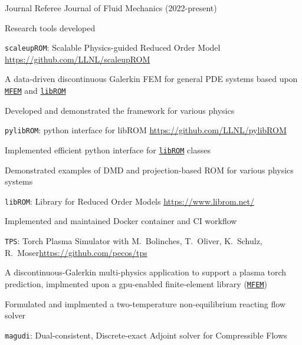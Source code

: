 \documentclass{resume} %
\begin{document}
\begin{rSection}{Journal Referee}
Journal of Fluid Mechanics (2022-present)
\end{rSection}


\begin{rSection}{Research tools developed}
\begin{rSubsection}{\texttt{scaleupROM}: Scalable Physics-guided Reduced Order Model}{}
{ }{\url{https://github.com/LLNL/scaleupROM}}
\item A data-driven discontinuous Galerkin FEM for general PDE systems
based upon \href{https://mfem.org}{\texttt{MFEM}} and \href{https://www.librom.net}{\texttt{libROM}}
\item Developed and demonstrated the framework for various physics
\end{rSubsection}
\begin{rSubsection}{\texttt{pylibROM}: python interface for libROM}{}
{ }{\url{https://github.com/LLNL/pylibROM}}
\item Implemented efficient python interface for \href{https://www.librom.net}{\texttt{libROM}} classes
\item Demonstrated examples of DMD and projection-based ROM for various physics systems
\end{rSubsection}
\begin{rSubsection}{\texttt{libROM}: Library for Reduced Order Models}{}
{ }{\url{https://www.librom.net/}}
\item Implemented and maintained Docker container and CI workflow
\end{rSubsection}
\begin{rSubsection}{\texttt{TPS}: Torch Plasma Simulator}{}
{with M.\ Bolinches, T.\ Oliver, K.\ Schulz, R.\ Moser}{\url{https://github.com/pecos/tps}}
\item A discontinuous-Galerkin multi-physics application to support a plasma torch prediction,
implmented upon a gpu-enabled finite-element library (\href{https://mfem.org}{\texttt{MFEM}})
\item Formulated and implmented a two-temperature non-equilibrium reacting flow solver
\end{rSubsection}
\begin{rSubsection}{\texttt{magudi}: Dual-consistent, Discrete-exact Adjoint solver for Compressible Flows}{}

\end{rSubsection}
\end{rSection}
\end{document}
